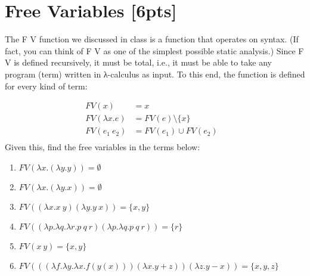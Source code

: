 \documentclass{article}
\begin{document}
\section{Free Variables [6pts]}
The F V function we discussed in class is a function that operates on syntax.
(If fact, you can think of F V as
one of the simplest possible static analysis.) Since F V is defined recursively,
it must be total, i.e., it must be
able to take any program (term) written in λ-calculus as input. To this end, the
function is defined for every
kind of term:

	\begin{align*}
		FV(x) &= x&\\
		FV(\lambda x.e) &= FV(e)\setminus\{x\}&\\
		FV(e_1\ e_2) &= FV(e_1)\cup FV(e_2)&\\
	\end{align*}
	Given this, find the free variables in the terms below:

	\begin{enumerate}
		\item $FV(\lambda x.(\lambda y.y))=\emptyset$
		\item $FV(\lambda x.(\lambda y.x))=\emptyset$
		\item $FV((\lambda x.x\ y)(\lambda y.y\ x))=\{x,y\}$
		\item $FV((\lambda p.\lambda q.\lambda r.p\ q\ r)(\lambda p.\lambda q.p\ q\
			r))=\{r\}$
		\item $FV(x\ y)=\{x,y\}$
		\item $FV(((\lambda f.\lambda y.\lambda x.f(y(x)))(\lambda x.y + z))(\lambda
			z.y-x))=\{x,y,z\}$
	\end{enumerate}
\end{document}
